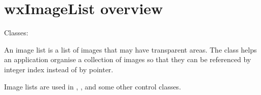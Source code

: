 \section{wxImageList overview}\label{wximagelistoverview}

Classes: 

An image list is a list of images that may have transparent areas.
The class helps an application organise a collection of images
so that they can be referenced by integer index instead of by
pointer.

Image lists are used in , 
,  and
some other control classes.

